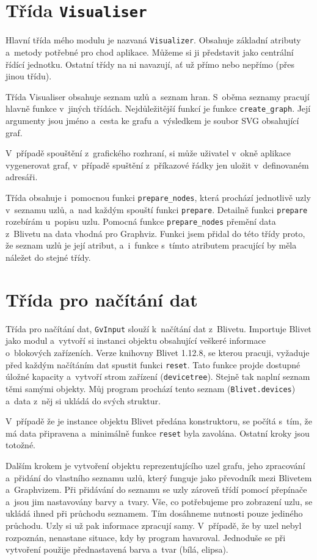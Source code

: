 \documentclass[printed,color,table,oneside,nolot,nolof]{fithesis}
\begin{document}
\section{Třída \texttt{Visualiser}}
	Hlavní třída mého modulu je nazvaná \texttt{Visualizer}. Obsahuje základní atributy a~metody potřebné pro chod aplikace. Můžeme si ji představit jako centrální řídící jednotku. Ostatní
	třídy na ni navazují, ať už přímo nebo nepřímo (přes jinou třídu). 

	Třída Visualiser obsahuje seznam uzlů a~seznam hran. S~oběma seznamy pracují hlavně funkce v~jiných třídách. Nejdůležitější funkcí
	je funkce \texttt{create\_graph}. Její argumenty jsou jméno a~cesta ke grafu a~výsledkem je soubor SVG obsahující graf. 
	
	V~případě spouštění z~grafického rozhraní, si může uživatel v~okně aplikace vygenerovat graf, v~případě spuštění z~příkazové řádky jen uložit v~definovaném adresáři. 

	Třída obsahuje i~pomocnou funkci \texttt{prepare\_nodes}, která prochází jednotlivě uzly v~seznamu uzlů, a~nad každým spouští funkci \texttt{prepare}. Detailně funkci \texttt{prepare} rozebírám u~popisu uzlu.
	Pomocná funkce \texttt{prepare\_nodes}
	přemění data z~Blivetu na data vhodná pro Graphviz. Funkci jsem přidal do této třídy proto, že seznam uzlů je její atribut, a~i~funkce s~tímto atributem pracující by měla náležet do stejné třídy.

\section{Třída pro načítání dat}
	Třída pro načítání dat, \texttt{GvInput} slouží k~načítání dat z~Blivetu. Importuje Blivet jako modul a~vytvoří si instanci objektu obsahující veškeré informace
	o~blokových zařízeních. Verze knihovny Blivet 1.12.8, se kterou pracuji, vyžaduje před 
	každým načítáním dat spustit funkci \texttt{reset}. Tato funkce projde dostupné úložné kapacity a~vytvoří strom zařízení (\texttt{devicetree}). Stejně tak naplní seznam těmi
	samými objekty. Můj program prochází tento seznam (\texttt{Blivet.devices}) a~data z~něj si ukládá do svých struktur. 
	
	V~případě že je instance objektu Blivet předána konstruktoru, se počítá s~tím, že má data připravena a~minimálně funkce \texttt{reset} byla zavolána.
	Ostatní kroky jsou totožné.

	Dalším krokem je vytvoření objektu reprezentujícího uzel grafu, jeho zpracování a~přidání do vlastního seznamu uzlů, který funguje jako převodník mezi Blivetem a~Graphvizem. Při
	přidávání do seznamu se uzly zároveň třídí pomocí přepínače a~jsou jim nastavovány barvy a~tvary. Vše, co potřebujeme pro zobrazení uzlu, se ukládá ihned při průchodu seznamem. 
	Tím dosáhneme nutnosti pouze jediného průchodu. Uzly si už pak informace zpracují samy. V~případě, že by uzel nebyl rozpoznán, nenastane situace, kdy by program 
	havaroval. Jednoduše se při vytvoření použije přednastavená barva a~tvar (bílá, elipsa).
\end{document}
